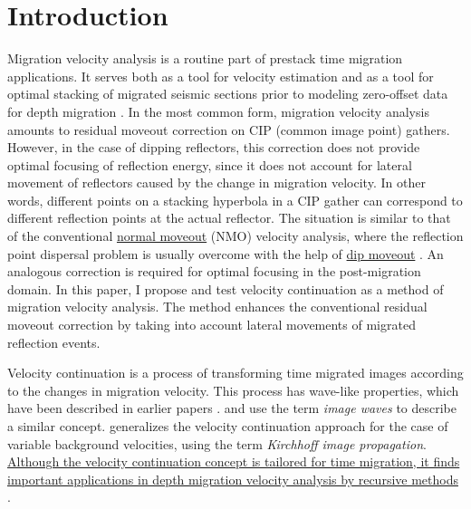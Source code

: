 \section{Introduction}
Migration velocity analysis is a routine part of prestack time
migration applications. It serves both as a tool for velocity
estimation \cite{FBR08.06.02240234} and as a tool for optimal stacking
of migrated seismic sections prior to modeling zero-offset data for depth
migration \cite{GEO62-02-05680576}. In the most common form, migration
velocity analysis amounts to residual moveout correction on CIP
(common image point) gathers. However, in the case of dipping
reflectors, this correction does not provide optimal focusing of
reflection energy, since it does not account for lateral movement of
reflectors caused by the change in migration velocity. In other words,
different points on a stacking hyperbola in a CIP gather can
correspond to different reflection points at the actual reflector. The
situation is similar to that of the conventional \uline{normal moveout} (NMO)
velocity analysis, where the reflection point dispersal problem is
usually overcome with the help of \uline{dip moveout} \cite{FBR04.07.00070024,dmo}. An
analogous correction is required for optimal focusing in the
post-migration domain. In this paper, I propose and test velocity
continuation as a method of migration velocity analysis. The method
enhances the conventional residual moveout correction by taking into
account lateral movements of migrated reflection events.

Velocity continuation is a process of transforming time migrated images
according to the changes in migration velocity. This process has wave-like
properties, which have been described in earlier papers
\cite{me,Fomel.segab.97,first}.   and
 use the term \emph{image waves} to describe a
similar concept.  generalizes the velocity
continuation approach for the case of variable background velocities, using
the term \emph{Kirchhoff image propagation}. \uline{Although the velocity
continuation concept is tailored for time migration, it finds important
applications in depth migration velocity analysis by recursive methods} 
\cite{SEG-1999-17231726,SEG-2000-08740877}.

